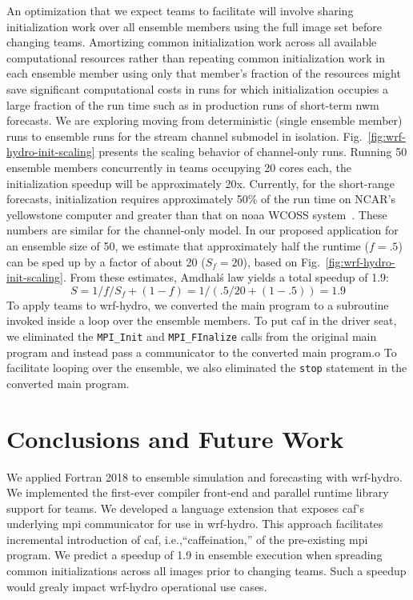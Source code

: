 An optimization that we expect teams to facilitate will involve sharing initialization
work over all ensemble members using
the full image set before changing teams. Amortizing common
initialization work across all available computational resources
rather than repeating common initialization work in each
ensemble member using only that member's fraction of the resources might
save significant computational costs in runs for which
initialization occupies a large fraction of
the run time such as in production runs of short-term \gls{nwm}
forecasts. We are exploring
moving from deterministic
(single ensemble member) runs to ensemble runs for the stream
channel submodel in isolation. Fig.~\ref{fig:wrf-hydro-init-scaling}
presents the scaling behavior of channel-only runs.
Running 50 ensemble members concurrently in
teams occupying 20 cores each, the initialization speedup will be
approximately 20x. Currently, for the short-range forecasts,
initialization requires approximately 50\% of the run time on
NCAR's yellowstone computer and greater than that on \gls{noaa} WCOSS
system~\cite{yuetal2017}. These numbers are
similar for the channel-only model. In our proposed application for an ensemble size of 50, we estimate that
approximately half the runtime ($f=.5$) can be sped up by a factor of
about 20 ($S_f=20$), based on Fig.~\ref{fig:wrf-hydro-init-scaling}. From
these estimates, Amdhal\'s law yields a total speedup
of 1.9:
\begin{equation}
S = 1 / { f/S_f + (1-f) } = 1 / (.5/20 + (1-.5)) = 1.9
\end{equation}
To apply teams to \gls{wrf-hydro}, we converted the main program to a subroutine
invoked inside a loop over the ensemble members.  To put \gls{caf} in the driver seat,
we eliminated the \texttt{MPI\_Init} and \texttt{MPI\_FInalize} calls from the original
main program and instead pass a communicator to the converted main program.o  To facilitate
looping over the ensemble, we also eliminated the \texttt{stop} statement in the converted
main program.

\section{Conclusions and Future Work}\label{sec:conclusions}
We applied Fortran 2018 to ensemble simulation and forecasting with \gls{wrf-hydro}.
We implemented the first-ever compiler front-end and parallel runtime library support
for teams.  We developed a language extension that exposes \gls{caf}'s
underlying \gls{mpi} communicator for use in \gls{wrf-hydro}.  This approach facilitates
incremental introduction of \gls{caf}, i.e.,``caffeination,'' of the
pre-existing \gls{mpi} program.  We predict a speedup of 1.9 in ensemble execution when
spreading common initializations across all images prior to changing teams.  Such a speedup
would grealy impact \gls{wrf-hydro} operational use cases.

